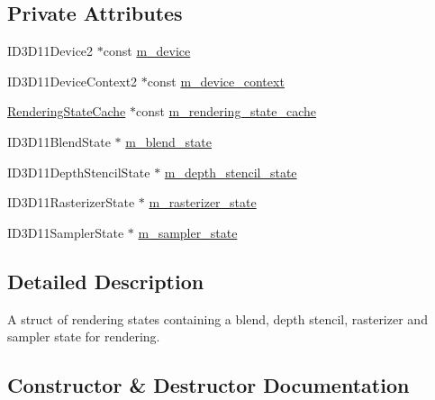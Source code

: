 \subsection*{Private Attributes}
\begin{DoxyCompactItemize}
\item 
I\+D3\+D11\+Device2 $\ast$const \hyperlink{structmage_1_1_rendering_state_a7985712bda141bfac079d4fb6d85cfec}{m\+\_\+device}
\item 
I\+D3\+D11\+Device\+Context2 $\ast$const \hyperlink{structmage_1_1_rendering_state_a13e46783f38a60fe032dc2aad708ec48}{m\+\_\+device\+\_\+context}
\item 
\hyperlink{structmage_1_1_rendering_state_cache}{Rendering\+State\+Cache} $\ast$const \hyperlink{structmage_1_1_rendering_state_a8d422a14392f89eec1ece2d917511168}{m\+\_\+rendering\+\_\+state\+\_\+cache}
\item 
I\+D3\+D11\+Blend\+State $\ast$ \hyperlink{structmage_1_1_rendering_state_ab08e5f63a1bd463ce6029eaaf3526ae4}{m\+\_\+blend\+\_\+state}
\item 
I\+D3\+D11\+Depth\+Stencil\+State $\ast$ \hyperlink{structmage_1_1_rendering_state_a2428412ad160c0d4dd2538c3a9cc863f}{m\+\_\+depth\+\_\+stencil\+\_\+state}
\item 
I\+D3\+D11\+Rasterizer\+State $\ast$ \hyperlink{structmage_1_1_rendering_state_a63b8c00bd0e2e1c56bd2a42f269733a8}{m\+\_\+rasterizer\+\_\+state}
\item 
I\+D3\+D11\+Sampler\+State $\ast$ \hyperlink{structmage_1_1_rendering_state_a88c58f587b9670d662aef5a3a52fa38d}{m\+\_\+sampler\+\_\+state}
\end{DoxyCompactItemize}


\subsection{Detailed Description}
A struct of rendering states containing a blend, depth stencil, rasterizer and sampler state for rendering. 

\subsection{Constructor \& Destructor Documentation}
\hypertarget{structmage_1_1_rendering_state_a6a1914effafb160ff1d05c8a1963278a}{}\label{structmage_1_1_rendering_state_a6a1914effafb160ff1d05c8a1963278a} 
